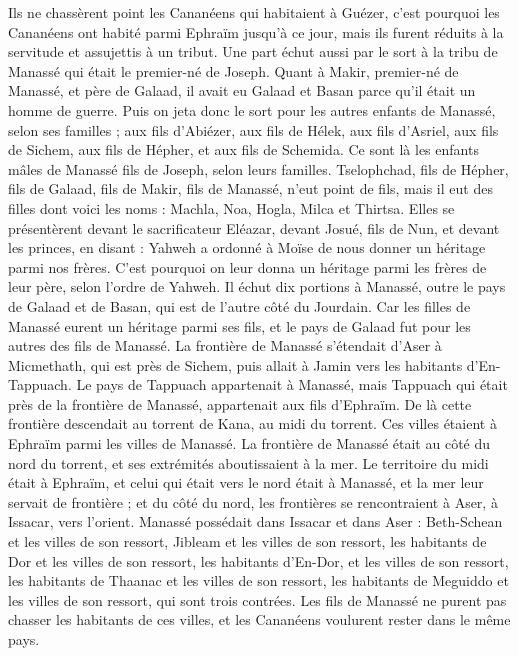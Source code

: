 \begin{multicols}{2}
Ils ne chassèrent point les Cananéens qui habitaient à Guézer, c’est pourquoi les Cananéens ont habité parmi Ephraïm jusqu’à ce jour, mais ils furent réduits à la servitude et assujettis à un tribut.
\VerseOne{}Une part échut aussi par le sort à la tribu de Manassé qui était le premier-né de Joseph. Quant à Makir, premier-né de Manassé, et père de Galaad, il avait eu Galaad et Basan parce qu’il était un homme de guerre.
Puis on jeta donc le sort pour les autres enfants de Manassé, selon ses familles ; aux fils d’Abiézer, aux fils de Hélek, aux fils d’Asriel, aux fils de Sichem, aux fils de Hépher, et aux fils de Schemida. Ce sont là les enfants mâles de Manassé fils de Joseph, selon leurs familles.
Tselophchad, fils de Hépher, fils de Galaad, fils de Makir, fils de Manassé, n’eut point de fils, mais il eut des filles dont voici les noms : Machla, Noa, Hogla, Milca et Thirtsa.
Elles se présentèrent devant le sacrificateur Eléazar, devant Josué, fils de Nun, et devant les princes, en disant : Yahweh a ordonné à Moïse de nous donner un héritage parmi nos frères. C’est pourquoi on leur donna un héritage parmi les frères de leur père, selon l’ordre de Yahweh.
Il échut dix portions à Manassé, outre le pays de Galaad et de Basan, qui est de l’autre côté du Jourdain.
Car les filles de Manassé eurent un héritage parmi ses fils, et le pays de Galaad fut pour les autres des fils de Manassé.
La frontière de Manassé s’étendait d’Aser à Micmethath, qui est près de Sichem, puis allait à Jamin vers les habitants d’En-Tappuach.
Le pays de Tappuach appartenait à Manassé, mais Tappuach qui était près de la frontière de Manassé, appartenait aux fils d’Ephraïm.
De là cette frontière descendait au torrent de Kana, au midi du torrent. Ces villes étaient à Ephraïm parmi les villes de Manassé. La frontière de Manassé était au côté du nord du torrent, et ses extrémités aboutissaient à la mer.
Le territoire du midi était à Ephraïm, et celui qui était vers le nord était à Manassé, et la mer leur servait de frontière ; et du côté du nord, les frontières se rencontraient à Aser, à Issacar, vers l’orient.
Manassé possédait dans Issacar et dans Aser : Beth-Schean et les villes de son ressort, Jibleam et les villes de son ressort, les habitants de Dor et les villes de son ressort, les habitants d’En-Dor, et les villes de son ressort, les habitants de Thaanac et les villes de son ressort, les habitants de Meguiddo et les villes de son ressort, qui sont trois contrées.
Les fils de Manassé ne purent pas chasser les habitants de ces villes, et les Cananéens voulurent rester dans le même pays.

\end{multicols}
